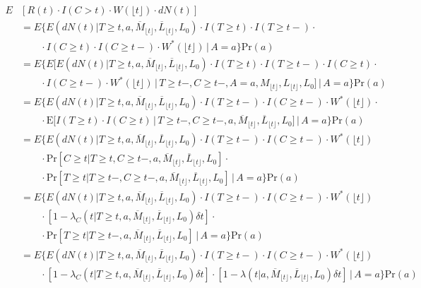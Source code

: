 \documentclass[AMA,STIX1COL]{WileyNJD-v2}
\newcommand{\Esp}{\text{E}}
\newcommand{\pr}{\text{Pr}}
\begin{document}
\begingroup
\fontsize{10pt}{10pt}\selectfont
\begin{align*}
E&[R(t)\cdot I(C>t)\cdot W(\lfloor t \rfloor) \cdot dN(t)]\\
&= E \bigg\{E(dN(t)| T\ge t, a, \overline{M}_{\lfloor t \rfloor},\overline{L}_{\lfloor t \rfloor}, L_{0})\cdot I(T\ge t)\cdot I(T\ge t-)\cdot\\
&\quad \quad\cdot I(C\ge t) \cdot I(C\ge t-) \cdot W^*(\lfloor t \rfloor)\,\bigg\rvert\,A=a \bigg\}\pr(a)\\
&= E \biggl\{E\biggl[E(dN(t) | T\ge t, a, \overline{M}_{\lfloor t \rfloor},\overline{L}_{\lfloor t \rfloor}, L_{0})\cdot I(T\ge t)\cdot I(T\ge t-)\cdot I(C\ge t)\cdot  \nonumber\\
&\quad\quad \cdot I(C\ge t-)\cdot W^*(\lfloor t \rfloor)\,\bigg\rvert\,T\ge t-, C\ge t-, A=a,M_{\lfloor t \rfloor},L_{\lfloor t \rfloor},L_0\biggr]\,\bigg\rvert\, A=a \biggr\}\pr(a)\\
&=E \biggl\{E(dN(t) | T\ge t, a,\overline{M}_{\lfloor t \rfloor},\overline{L}_{\lfloor t \rfloor}, L_{0})\cdot I(T\ge t-)\cdot I(C\ge t-) \cdot W^*(\lfloor t \rfloor)\cdot \nonumber\\
&\quad \quad \cdot \Esp\biggl[I(T\ge t)\cdot I(C\ge t)\,\bigg\rvert\,T\ge t-,C\ge t-,a,\overline{M}_{\lfloor t \rfloor},\overline{L}_{\lfloor t \rfloor},L_0\biggr] \,\bigg\rvert\, A=a\biggr\}\pr(a)\\
&=E \biggl\{E(dN(t) | T\ge t, a,\overline{M}_{\lfloor t \rfloor},\overline{L}_{\lfloor t \rfloor}, L_{0})\cdot I(T\ge t-)\cdot I(C\ge t-) \cdot W^*(\lfloor t \rfloor)\nonumber\\
&\quad\quad \cdot \pr[C\ge t|T\ge t,C\ge t-,a,\overline{M}_{\lfloor t \rfloor},\overline{L}_{\lfloor t \rfloor},L_0]\cdot \\
&\quad \quad\cdot \pr[T\ge t|T\ge t-,C\ge t-,a,\overline{M}_{\lfloor t \rfloor},\overline{L}_{\lfloor t \rfloor},L_0] \,\bigg\rvert\, A=a\biggr\}\pr(a)\\
&=E \biggl\{E(dN(t) | T\ge t, a,\overline{M}_{\lfloor t \rfloor},\overline{L}_{\lfloor t \rfloor}, L_{0})\cdot I(T\ge t-)\cdot I(C\ge t-) \cdot W^*(\lfloor t \rfloor)\nonumber\\
&\quad\quad \cdot [1-\lambda_C(t|T\ge t,a,\overline{M}_{\lfloor t \rfloor},\overline{L}_{\lfloor t \rfloor},L_0)\delta t]\cdot \\
&\quad \quad\cdot \pr[T\ge t|T\ge t-,a,\overline{M}_{\lfloor t \rfloor},\overline{L}_{\lfloor t \rfloor},L_0] \,\bigg\rvert\, A=a\biggr\}\pr(a)\\
&=E \biggl\{E(dN(t) | T\ge t, a,\overline{M}_{\lfloor t \rfloor},\overline{L}_{\lfloor t \rfloor}, L_{0})\cdot I(T\ge t-)\cdot I(C\ge t-) \cdot W^*(\lfloor t \rfloor)\nonumber\\
&\quad\quad \cdot [1-\lambda_C(t|T\ge t,a,\overline{M}_{\lfloor t \rfloor},\overline{L}_{\lfloor t \rfloor},L_0)\delta t]\cdot [1-\lambda(t|a,\overline{M}_{\lfloor t \rfloor},\overline{L}_{\lfloor t \rfloor},L_0)\delta t] \,\bigg\rvert\, A=a\biggr\}\pr(a)
\end{align*}
\endgroup
\end{document}

